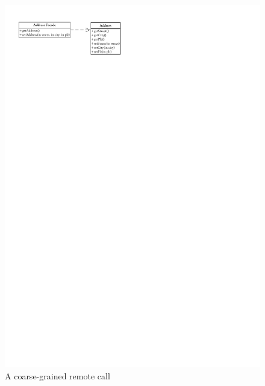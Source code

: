 			\begin{figure}[htb]
				\begin{center}
					\includegraphics{./files/inc/figures/patternsRemoteFacade}
					\caption{\label{fig:patternsRemoteFacade} A coarse-grained remote call}
				\end{center}
			\end{figure}
			
